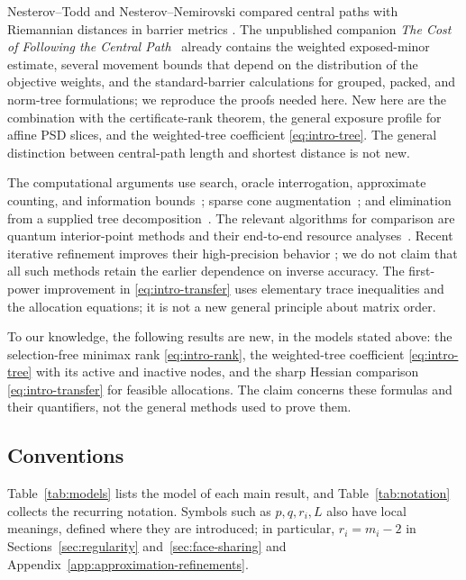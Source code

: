 Nesterov--Todd and Nesterov--Nemirovski compared central paths with
Riemannian distances in barrier metrics
\citep{NT2002,NesterovNemirovski2008}. The unpublished companion
\emph{The Cost of Following the Central
Path}~\citep{CentralPathCompanion} already contains the weighted
exposed-minor estimate, several movement bounds that depend on the
distribution of the objective weights, and the standard-barrier
calculations for grouped, packed, and norm-tree formulations; we
reproduce the proofs needed here. New here are the combination with the
certificate-rank theorem, the general exposure profile for affine PSD
slices, and the weighted-tree coefficient \eqref{eq:intro-tree}. The
general distinction between central-path length and shortest distance is
not new.

The computational arguments use search, oracle interrogation,
approximate counting, and information
bounds~\citep{BBBV1997,vanDam1998,NayakWu1999,Nayak1999,BHMT2002};
sparse cone augmentation~\citep{DomahidiChuBoyd2013}; and elimination
from a supplied tree decomposition~\citep{FurerHoppenTrevisan2025}. The
relevant algorithms for comparison are quantum interior-point methods
and their end-to-end resource
analyses~\citep{AugustinoEtAl2023,DalzellEtAl2023}. Recent iterative
refinement improves their high-precision behavior
\citep{MohammadisiahroudiEtAl2026}; we do not claim that all such
methods retain the earlier dependence on inverse accuracy. The
first-power improvement in \eqref{eq:intro-transfer} uses elementary
trace inequalities and the allocation equations; it is not a new general
principle about matrix order.

To our knowledge, the following results are new, in the models stated
above: the selection-free minimax rank \eqref{eq:intro-rank}, the
weighted-tree coefficient \eqref{eq:intro-tree} with its active and
inactive nodes, and the sharp Hessian comparison
\eqref{eq:intro-transfer} for feasible allocations. The claim concerns
these formulas and their quantifiers, not the general methods used to
prove them.

\subsection{Conventions}
Table~\ref{tab:models} lists the model of each main result, and
Table~\ref{tab:notation} collects the recurring notation. Symbols such
as $p,q,r_i,L$ also have local meanings, defined where they are introduced;
in particular, $r_i=m_i-2$ in Sections~\ref{sec:regularity}
and~\ref{sec:face-sharing} and Appendix~\ref{app:approximation-refinements}.

